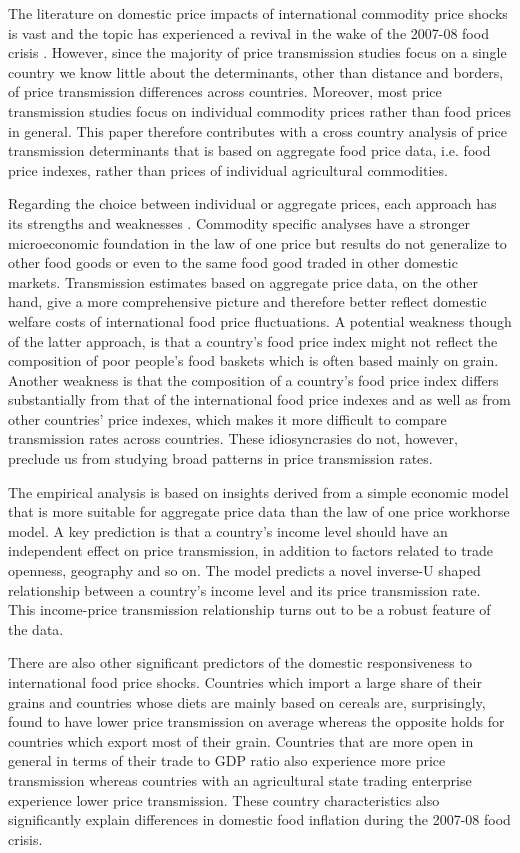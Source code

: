 \documentclass[12pt,english]{article}
\begin{document}
The literature on domestic price impacts of international commodity price shocks is vast and the topic has experienced a revival in the wake of the 2007-08 food crisis \citep[see][]{Fackler2001, kouyate16}. However, since the majority of price transmission studies focus on a single country we know little about the determinants, other than distance and borders, of price transmission differences across countries. Moreover, most price transmission studies focus on individual commodity prices rather than food prices in general. This paper therefore contributes with a cross country analysis of price transmission determinants that is based on aggregate food price data, i.e. food price indexes, rather than prices of individual agricultural commodities.

Regarding the choice between individual or aggregate prices, each approach has its strengths and weaknesses \citep{headey10}. Commodity specific analyses have a stronger microeconomic foundation in the law of one price but results do not generalize to other food goods or even to the same food good traded in other domestic markets. Transmission estimates based on aggregate price data, on the other hand, give a more comprehensive picture and therefore better reflect domestic welfare costs of international food price fluctuations. A potential weakness though of the latter approach, is that a country's food price index might not reflect the composition of poor people's food baskets which is often based mainly on grain. Another weakness is that the composition of a country's food price index differs substantially from that of the international food price indexes and as well as from other countries' price indexes, which makes it more difficult to compare transmission rates across countries. These idiosyncrasies do not, however, preclude us from studying broad patterns in price transmission rates.

The empirical analysis is based on insights derived from a simple economic model that is more suitable for aggregate price data than the law of one price workhorse model. A key prediction is that a country's income level should have an independent effect on price transmission, in addition to factors related to trade openness, geography and so on. The model predicts a novel inverse-U shaped relationship between a country's income level and its price transmission rate. This income-price transmission relationship turns out to be a robust feature of the data. 

There are also other significant predictors of the domestic responsiveness to international food price shocks. Countries which import a large share of their grains and countries whose diets are mainly based on cereals are, surprisingly, found to have lower price transmission on average whereas the opposite holds for countries which export most of their grain. Countries that are more open in general in terms of their trade to GDP ratio also experience more price transmission whereas countries with an agricultural state trading enterprise experience lower price transmission. These country characteristics also significantly explain differences in domestic food inflation during the 2007-08 food crisis.
\end{document}
